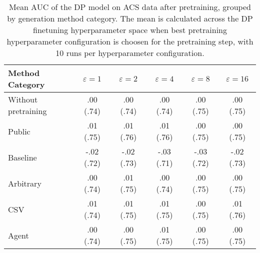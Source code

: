 \begin{table}[h!]
    \centering
    \caption{Mean AUC of the DP model on ACS data after pretraining, grouped by generation method category. The mean is calculated across the DP finetuning hyperparameter space when best pretraining hyperparameter configuration is choosen for the pretraining step, with 10 runs per hyperparameter configuration.}
    \label{tab:epsilon_comparison}
    \begin{tabular}{lccccc}
    \toprule
    Method Category & $\varepsilon=1$ & $\varepsilon=2$ & $\varepsilon=4$ & $\varepsilon=8$ & $\varepsilon=16$ \\
    \midrule
    Without pretraining & .00 {\small (.74)} & .00 {\small (.74)} & .00 {\small (.74)} & .00 {\small (.75)} & .00 {\small (.75)} \\
    \arrayrulecolor{black!50!}\midrule
    Public & \cellcolor{gold!30}.01 {\small (.75)} & \cellcolor{gold!30}.01 {\small (.76)} & \cellcolor{gold!30}.01 {\small (.76)} & \cellcolor{gold!30}.00 {\small (.75)} & \cellcolor{silver!30}.00 {\small (.75)} \\
    \arrayrulecolor{black!50!}\midrule
    Baseline & -.02 {\small (.72)} & -.02 {\small (.73)} & -.03 {\small (.71)} & -.03 {\small (.72)} & -.02 {\small (.73)} \\
    \arrayrulecolor{black!50!}\midrule
    Arbitrary & .00 {\small (.74)} & \cellcolor{bronze!30}.01 {\small (.75)} & .00 {\small (.74)} & \cellcolor{bronze!30}.00 {\small (.75)} & \cellcolor{bronze!30}.00 {\small (.75)} \\
    \arrayrulecolor{black!50!}\midrule
    CSV & \cellcolor{silver!30}.01 {\small (.74)} & \cellcolor{silver!30}.01 {\small (.75)} & \cellcolor{silver!30}.01 {\small (.75)} & \cellcolor{gold!30}.00 {\small (.75)} & \cellcolor{gold!30}.01 {\small (.76)} \\
    Agent & \cellcolor{bronze!30}.00 {\small (.74)} & .00 {\small (.75)} & \cellcolor{bronze!30}.01 {\small (.75)} & \cellcolor{silver!30}.00 {\small (.75)} & \cellcolor{silver!30}.00 {\small (.75)} \\
    \bottomrule
    \end{tabular}
\end{table}